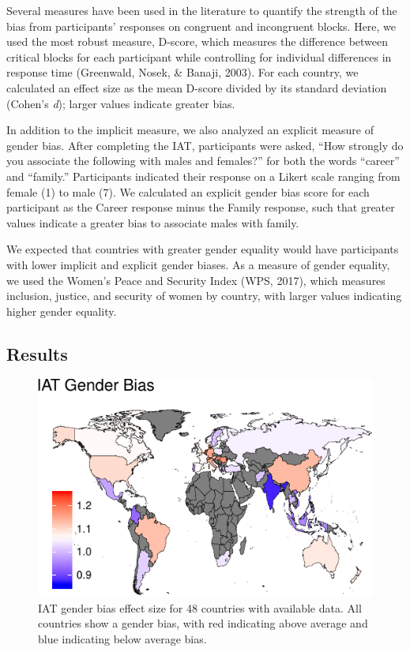 \documentclass[10pt, letterpaper]{article}
\newenvironment{CodeChunk}{}{}
\begin{document}
Several measures have been used in the literature to quantify the
strength of the bias from participants' responses on congruent and
incongruent blocks. Here, we used the most robust measure, D-score,
which measures the difference between critical blocks for each
participant while controlling for individual differences in response
time (Greenwald, Nosek, \& Banaji, 2003). For each country, we
calculated an effect size as the mean D-score divided by its standard
deviation (Cohen's \emph{d}); larger values indicate greater bias.

In addition to the implicit measure, we also analyzed an explicit
measure of gender bias. After completing the IAT, participants were
asked, ``How strongly do you associate the following with males and
females?'' for both the words ``career'' and ``family.'' Participants
indicated their response on a Likert scale ranging from female (1) to
male (7). We calculated an explicit gender bias score for each
participant as the Career response minus the Family response, such that
greater values indicate a greater bias to associate males with family.

We expected that countries with greater gender equality would have
participants with lower implicit and explicit gender biases. As a
measure of gender equality, we used the Women's Peace and Security Index
(WPS, 2017), which measures inclusion, justice, and security of women by
country, with larger values indicating higher gender equality.

\subsection{Results}\label{results}

\begin{CodeChunk}
\begin{figure}[t]

{\centering \includegraphics{figs/map-1} 

}

\caption[IAT gender bias effect size for 48 countries with available data]{IAT gender bias effect size for 48 countries with available data. All countries show a gender bias, with red indicating above average and blue indicating below average bias.}\label{fig:map}
\end{figure}
\end{CodeChunk}
\end{document}
